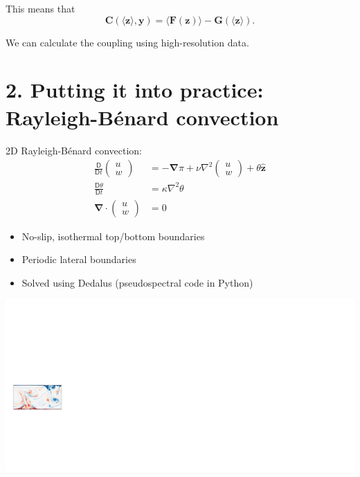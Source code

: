 \documentclass[12pt, aspectratio=169]{beamer}
\newcommand{\Diff}[2]{\frac{\mathsf{D} #1}{\mathsf{D} #2}}
\renewcommand\vec{\bm}
\newcommand{\uvec}[1]{\vec{\hat{#1}}}
\newcommand{\grad}{\vec{\nabla}}
\newcommand{\rb}{Rayleigh-B\'{e}nard}
\begin{document}
\begin{frame}
This means that
\[
    \vec{C}(\langle \vec{z} \rangle, \vec{y})
    = \langle \vec{F}(\vec{z}) \rangle - \vec{G}(\langle \vec{z} \rangle).
\]
\vfill
\begin{center}
    \alert{We can calculate the coupling using high-resolution data.}
\end{center}
\end{frame}

\section{2. Putting it into practice: \rb{} convection}

\begin{frame}
2D \rb{} convection:
\begin{align*}
    \Diff{}{t} \begin{pmatrix} u \\ w \end{pmatrix}
        &= -\grad \pi + \nu \nabla^2 \begin{pmatrix} u \\ w \end{pmatrix}
        + \theta \uvec{z} \\[5pt]
    \Diff{\theta}{t}  &= \kappa \nabla^2 \theta \\[5pt]
    \grad \cdot \begin{pmatrix} u \\ w \end{pmatrix} &= 0
\end{align*}
\begin{itemize}
    \item No-slip, isothermal top/bottom boundaries
    \item Periodic lateral boundaries
    \item Solved using Dedalus (pseudospectral code in Python)
\end{itemize}
\end{frame}

\begin{frame}
\centering
\includegraphics[width=\linewidth]{figures/method1.pdf}
\end{frame}
\end{document}
